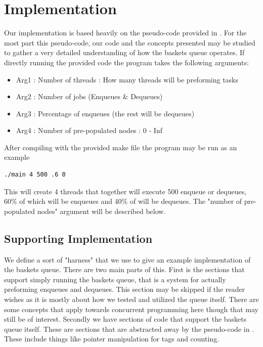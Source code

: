 \documentclass[conference]{IEEEtran}
\begin{document}
\section{Implementation}
Our implementation is based heavily on the pseudo-code provided in \cite{baskets}.  For the most part this pseudo-code, our code and the concepts presented may be studied to gather a very detailed understanding of how the baskets queue operates.\break
If directly running the provided code the program takes the following arguments:
\begin{itemize}
  \item Arg1 : Number of threads : How many threads will be preforming tasks
  \item Arg2 : Number of jobs (Enqueues \& Dequeues)
  \item Arg3 : Percentage of enqueues (the rest will be dequeues)
  \item Arg4 : Number of pre-populated nodes : 0 - Inf
\end{itemize}
After compiling with the provided make file the program may be run as an example
\begin{lstlisting}
./main 4 500 .6 0
\end{lstlisting}
This will create 4 threads that together will execute 500 enqueue or dequeues, 60\% of which will be enqueues and 40\% of will be dequeues.  The "number of pre-populated nodes" argument will be described below.

\subsection{Supporting Implementation}
We define a sort of "harness" that we use to give an example implementation of the baskets queue.  There are two main parts of this.  First is the sections that support simply running the baskets queue, that is a system for actually preforming enqueues and dequeues.  This section may be skipped if the reader wishes as it is mostly about how we tested and utilized the queue itself.  There are some concepts that apply towards concurrent programming here though that may still be of interest.  Secondly we have sections of code that support the baskets queue itself.  These are sections that are abstracted away by the pseudo-code in \cite{baskets}.  These include things like pointer manipulation for tags and counting.\break
\end{document}

